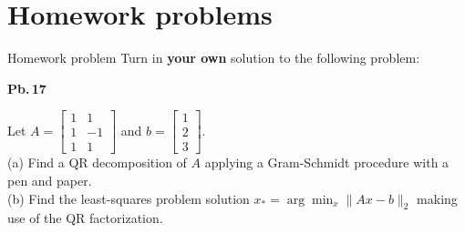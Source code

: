 \documentclass[t,usepdftitle=false]{beamer}
\begin{document}
\section{Homework problems}
\begin{frame}{Homework problem}\vspace{.1cm}
Turn in \textbf{your own} solution to the following problem:\vspace{.15cm}\\
\begin{minipage}[t]{0.1\textwidth}
\textbf{Pb.$\,$17}
\end{minipage}
\begin{minipage}[t]{0.89\textwidth}
Let $A=\begin{bmatrix}1&1\\1&-1\\1&1\end{bmatrix}$ and $b=\begin{bmatrix}1\\2\\3\end{bmatrix}$.\vspace{.4cm}\\
(a) Find a QR decomposition of $A$ applying a Gram-Schmidt procedure with a pen and paper.\vspace{.1cm}\\
(b) Find the least-squares problem solution $x_*=\arg\min_x\|Ax-b\|_2$ making use of the QR factorization.
\end{minipage}\vspace{.15cm}
\end{frame}
\end{document}
